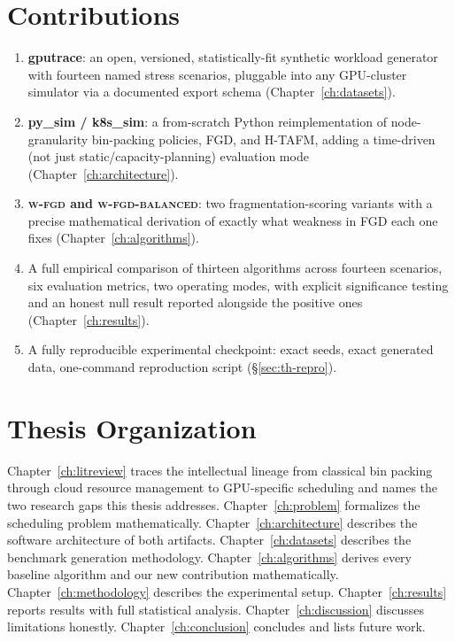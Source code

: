 \documentclass[12pt]{report}
\begin{document}
\section{Contributions}
\begin{enumerate}[leftmargin=1.4em]
\item \textbf{gputrace}: an open, versioned, statistically-fit
  synthetic workload generator with fourteen named stress scenarios,
  pluggable into any GPU-cluster simulator via a documented export
  schema (Chapter~\ref{ch:datasets}).
\item \textbf{py\_sim / k8s\_sim}: a from-scratch Python reimplementation
  of node-granularity bin-packing policies, FGD, and H-TAFM, adding a
  time-driven (not just static/capacity-planning) evaluation mode
  (Chapter~\ref{ch:architecture}).
\item \textbf{\textsc{w-fgd} and \textsc{w-fgd-balanced}}: two
  fragmentation-scoring variants with a precise mathematical derivation
  of exactly what weakness in FGD each one fixes
  (Chapter~\ref{ch:algorithms}).
\item A full empirical comparison of thirteen algorithms across fourteen
  scenarios, six evaluation metrics, two operating modes, with explicit
  significance testing and an honest null result reported alongside the
  positive ones (Chapter~\ref{ch:results}).
\item A fully reproducible experimental checkpoint: exact seeds, exact
  generated data, one-command reproduction script
  (\S\ref{sec:th-repro}).
\end{enumerate}

\section{Thesis Organization}
Chapter~\ref{ch:litreview} traces the intellectual lineage from classical
bin packing through cloud resource management to GPU-specific scheduling
and names the two research gaps this thesis addresses. Chapter~\ref{ch:problem}
formalizes the scheduling problem mathematically. Chapter~\ref{ch:architecture}
describes the software architecture of both artifacts.
Chapter~\ref{ch:datasets} describes the benchmark generation methodology.
Chapter~\ref{ch:algorithms} derives every baseline algorithm and our new
contribution mathematically. Chapter~\ref{ch:methodology} describes the
experimental setup. Chapter~\ref{ch:results} reports results with full
statistical analysis. Chapter~\ref{ch:discussion} discusses limitations
honestly. Chapter~\ref{ch:conclusion} concludes and lists future work.
\end{document}
